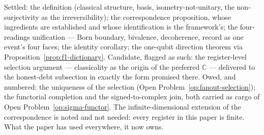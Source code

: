 Settled: the definition (classical structure, basis, isometry-not-unitary, the non-surjectivity as
the irreversibility); the correspondence proposition, whose ingredients are established and whose
identification is the framework's; the four-readings unification --- Born boundary, bivalence,
decoherence, record as one event's four faces; the identity corollary; the one-qubit direction
theorem via Proposition~\ref{prop:f1-dictionary}. Candidate, flagged as such: the register-level
selection argument --- classicality as the origin of the preferred $\mathbb{C}$ --- delivered to
the honest-debt subsection in exactly the form promised there. Owed, and numbered: the uniqueness
of the selection (Open Problem~\ref{op:fanout-selection}); the functorial completion and the
signed-to-complex join, both carried as cargo of Open Problem~\ref{op:sigma-functor}. The
infinite-dimensional extension of the correspondence is noted and not needed: every register in
this paper is finite. What the paper has used everywhere, it now owns.
